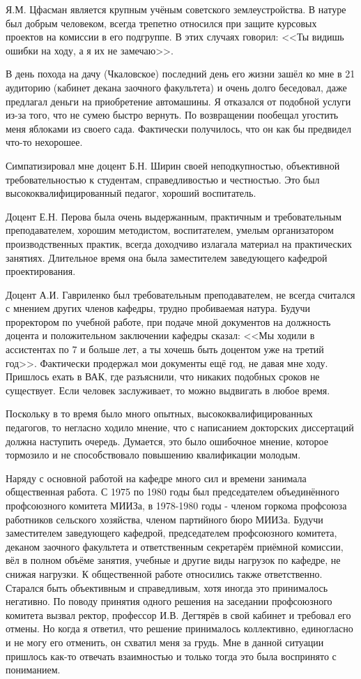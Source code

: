 Я.М. Цфасман является крупным учёным советского землеустройства. В натуре был добрым человеком, всегда трепетно относился при защите курсовых проектов на комиссии в его подгруппе. В этих случаях говорил: <<Ты видишь ошибки на ходу, а я их не замечаю>>.

В день похода на дачу (Чкаловское) последний день его жизни зашёл ко мне в 21 аудиторию (кабинет декана заочного факультета) и очень долго беседовал, даже предлагал деньги на приобретение автомашины. Я отказался от подобной услуги из-за того, что не сумею быстро вернуть. По возвращении пообещал угостить меня яблоками из своего сада. Фактически получилось, что он как бы предвидел что-то нехорошее.

Симпатизировал мне доцент Б.Н. Ширин своей неподкупностью, объективной требовательностью к студентам, справедливостью и честностью. Это был высококвалифицированный педагог, хороший воспитатель.

Доцент Е.Н. Перова была очень выдержанным, практичным и требовательным преподавателем, хорошим методистом, воспитателем, умелым организатором производственных практик, всегда доходчиво излагала материал на практических занятиях. Длительное время она была заместителем заведующего кафедрой проектирования.

Доцент А.И. Гавриленко был требовательным преподавателем, не всегда считался с мнением других членов кафедры, трудно пробиваемая натура. Будучи проректором по учебной работе, при подаче мной документов на должность доцента и положительном заключении кафедры сказал: <<Мы ходили в ассистентах по 7 и больше лет, а ты хочешь быть доцентом уже на третий год>>. Фактически продержал мои документы ещё год, не давая мне ходу. Пришлось ехать в ВАК, где разъяснили, что никаких подобных сроков не существует. Если человек заслуживает, то можно выдвигать в любое время.

Поскольку в то время было много опытных, высококвалифицированных педагогов, то негласно ходило мнение, что с написанием докторских диссертаций должна наступить очередь. Думается, это было ошибочное мнение, которое тормозило и не способствовало повышению квалификации молодым.

Наряду с основной работой на кафедре много сил и времени занимала общественная работа. С 1975 по 1980 годы был председателем объединённого профсоюзного комитета МИИЗа, в 1978-1980 годы - членом горкома профсоюза работников сельского хозяйства, членом партийного бюро МИИЗа. Будучи заместителем заведующего кафедрой, председателем профсоюзного комитета, деканом заочного факультета и ответственным секретарём приёмной комиссии, вёл в полном объёме занятия, учебные и другие виды нагрузок по кафедре, не снижая нагрузки. К общественной работе относились также ответственно. Старался быть объективным и справедливым, хотя иногда это принималось негативно. По поводу принятия одного решения на заседании профсоюзного комитета вызвал ректор, профессор И.В. Дегтярёв в свой кабинет и требовал его отмены. Но когда я ответил, что решение принималось коллективно, единогласно и не могу его отменить, он схватил меня за грудь. Мне в данной ситуации пришлось как-то отвечать взаимностью и только тогда это была воспринято с пониманием.

